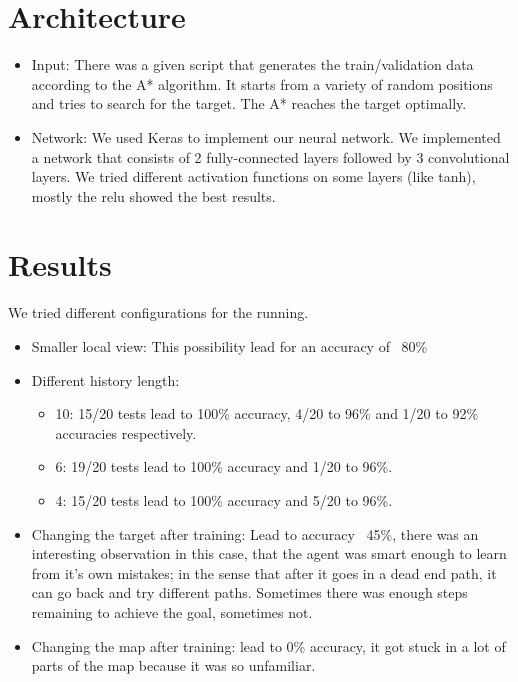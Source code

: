\documentclass[a4paper]{article}
\begin{document}
\section{Architecture}
\begin{itemize}
\item Input: There was a given script that generates the train/validation data according to the A* algorithm. It starts from a variety of random positions and tries to search for the target. The A* reaches the target optimally.

\item Network: We used Keras to implement our neural network. We implemented a network that consists of 2 fully-connected layers followed by 3 convolutional layers. We tried different activation functions on some layers (like tanh), mostly the relu showed the best results.
\end{itemize}

\section{Results}
We tried different configurations for the running.
\begin{itemize}
\item Smaller local view: This possibility lead for an accuracy of ~80\%
\item Different history length: 
	\begin{itemize}
		\item 10: 15/20 tests lead to 100\% accuracy, 4/20 to 96\% and 1/20 to 92\% accuracies respectively.
		\item 6: 19/20 tests lead to 100\% accuracy and 1/20 to 96\%.
		\item 4: 15/20 tests lead to 100\% accuracy and 5/20 to 96\%.
	\end{itemize}
\item Changing the target after training: Lead to accuracy ~45\%, there was an interesting observation in this case, that the agent was smart enough to learn from it's own mistakes; in the sense that after it goes in a dead end path, it can go back and try different paths. Sometimes there was enough steps remaining to achieve the goal, sometimes not.
\item Changing the map after training: lead to 0\% accuracy, it got stuck in a lot of parts of the map because it was so unfamiliar.


\end{itemize}
\end{document}
